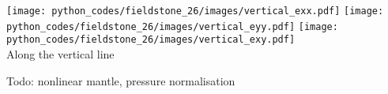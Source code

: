 \begin{center}
\texttt{[image: python\_codes/fieldstone\_26/images/vertical\_exx.pdf]}
\texttt{[image: python\_codes/fieldstone\_26/images/vertical\_eyy.pdf]}
\texttt{[image: python\_codes/fieldstone\_26/images/vertical\_exy.pdf]}\\
Along the vertical line
\end{center}




Todo: nonlinear mantle, pressure normalisation 

